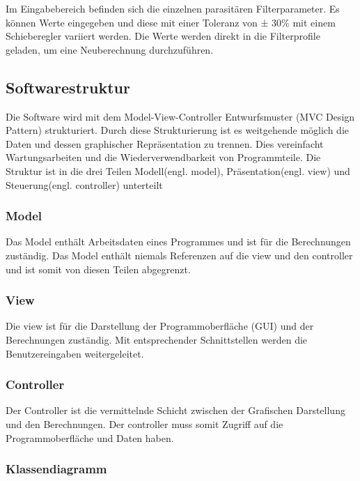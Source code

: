 Im Eingabebereich befinden sich die einzelnen parasitären Filterparameter. Es können Werte eingegeben und diese mit einer Toleranz von ± 30\% mit einem Schieberegler variiert werden. Die Werte werden direkt in die Filterprofile geladen, um eine Neuberechnung durchzuführen.

\newpage

\subsection{Softwarestruktur} \label{subsec:softwarestruktur}

Die Software wird mit dem Model-View-Controller Entwurfsmuster (MVC Design Pattern) \cite{MVCDesignPattern} strukturiert. Durch diese Strukturierung ist es weitgehende möglich die Daten und dessen graphischer Repräsentation zu trennen. Dies vereinfacht Wartungsarbeiten und die Wiederverwendbarkeit von Programmteile. Die Struktur ist in die drei Teilen Modell(engl. model), Präsentation(engl. view) und Steuerung(engl. controller) unterteilt

\subsubsection{Model} \label{subsubsec:model}

Das Model enthält Arbeitsdaten eines Programmes und ist für die Berechnungen zuständig. Das Model enthält niemals Referenzen auf die view und den controller und ist somit von diesen Teilen abgegrenzt.

\subsubsection{View} \label{subsubsec:model}
Die view ist für die Darstellung der Programmoberfläche (GUI) und der Berechnungen zuständig. Mit entsprechender Schnittstellen werden die Benutzereingaben weitergeleitet.

\subsubsection{Controller} \label{subsubsec:model}

Der Controller ist die vermittelnde Schicht zwischen der Grafischen Darstellung und den Berechnungen. Der controller muss somit Zugriff auf die Programmoberfläche und Daten haben.

\newpage 

\subsubsection{Klassendiagramm} \label{subsubsec:model}

